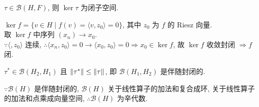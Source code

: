 \documentclass{note}
\begin{document}
\begin{cor}\label{cor-13.2}
    $\tau\in\mathcal{B}(H,F)$, 则 $\ker\tau$ 为闭子空间.
\end{cor}
\begin{pf}
    $\ker f=\{v\in H\mid f(v)=\langle v,z_0\rangle=0\}$, 其中 $z_0$ 为 $f$ 的 Riesz 向量.\\
    取 $\ker f$ 中序列 $(x_n)\rightarrow x_0$.\\
    $\because\langle,z_0\rangle$ 连续, $\therefore\langle x_n,z_0\rangle=0\rightarrow\langle x_0,z_0\rangle=0\Longrightarrow x_0\in\ker f$, 故 $\ker f$ 收敛封闭 $\Longrightarrow f$ 闭.
\end{pf}

$\tau^*\in\mathcal{B}(H_2,H_1)$ 且 $\left\lVert\tau^*\right\rVert\leq\left\lVert\tau\right\rVert$, 即 $\mathcal{B}(H_1,H_2)$ 是伴随封闭的.
\begin{pf}
    
\end{pf}

$\because\mathcal{B}(H)$ 是伴随封闭的, $\mathcal{B}(H)$ 关于线性算子的加法和复合成环, 关于线性算子的加法和点乘成向量空间, $\therefore\mathcal{B}(H)$ 为辛代数.
\ifx\allfiles\undefined
\end{document}
